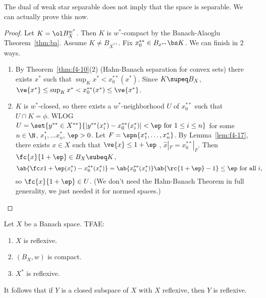 %
The dual of weak star separable does not imply that the space is separable. We can actually prove this now.
\begin{proof}
Let $K=\ol B_X^{w^*}$. Then $K$ is $w^*$-compact by the Banach-Alaoglu Theorem~\ref{thm:ba}. Assume $K\ne B_{X^{**}}$. Fix $x_0^{**}\in B_{x^{**}}\bs K$. 
We can finish in 2 ways.
\begin{enumerate}
\item
By Theorem~\ref{thm:f4-10}(2) (Hahn-Banach separation for convex sets) there exists $x^*$ such that $\sup_K x^*<x_0^{**}(x^*)$.
Since $K\supeq B_X$, $\ve{x^*}\le\sup_K x^*<x_0^{**}(x^*)\le \ve{x^*}$.
\item
$K$ is $w^*$-closed, so there exists a $w^*$-neighborhood $U$ of $x_0^{**}$ such that $U\cap K=\phi$. WLOG $U=\set{y^{**}\in X^{**}}{|y^{**}(x_i^*)-x_0^{**}(x_i^*)|<\ep\text{ for }1\le i\le n}$ for some $n\in \N$, $x_1^*,\ldots x_n^*$, $\ep>0$. Let $F=\spn\{x_1^*,\ldots, x_n^*\}$. By Lemma~\ref{lem:f4-17}, there exists $x\in X$ such that $\ve{x}\le 1+\ep$ , $\hat x|_F=x_0^{**}|_F$. Then $\fc{x}{1+\ep}\in B_X\subeq K$,
\[
\ab{\fc x{1+\ep}(x_i^*)-x_0^{**}(x_i^*)}=\ab{x_0^{**}(x_i^*)}\ab{\rc{1+\ep}-1}\le \ep \text{ for all }i,
\]
so $\fc{x}{1+\ep}\in U$.  
(We don't need the Hahn-Banach Theorem in full generality, we just needed it for normed spaces.)
\end{enumerate}
\end{proof}
\begin{thm}
Let $X$ be a Banach space. TFAE:
\begin{enumerate}
\item
$X$ is reflexive.
\item
$(B_X, w)$ is compact.
\item
$X^*$ is reflexive.
\end{enumerate}
It follows that if $Y$ is a closed subspace of $X$ with $X$ reflexive, then $Y$ is reflexive.
\end{thm}
